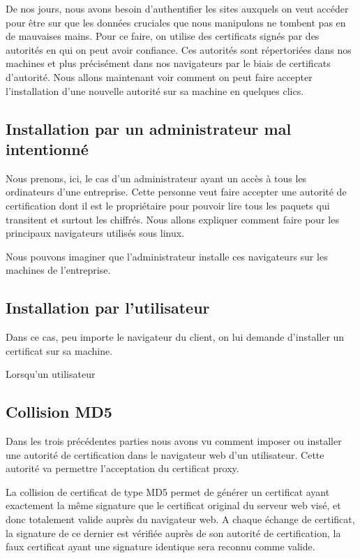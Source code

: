 De nos jours, nous avons besoin d'authentifier les sites auxquels on veut accéder pour être sur que les données cruciales que nous manipulons ne tombent pas en de mauvaises mains. Pour ce faire, on utilise des certificats signés par des autorités en qui on peut avoir confiance.
Ces autorités sont répertoriées dans nos machines et plus précisément dans nos navigateurs par le biais de certificats d'autorité.
Nous allons maintenant voir comment on peut faire accepter l'installation d'une nouvelle autorité sur sa machine en quelques clics.




\subsection{Installation par un administrateur mal intentionné}
Nous prenons, ici, le cas d'un administrateur ayant un accès à tous les ordinateurs d'une entreprise.
Cette personne veut faire accepter une autorité de certification dont il est le propriétaire pour pouvoir lire tous les paquets qui transitent et surtout les chiffrés.
Nous allons expliquer comment faire pour les principaux navigateurs utilisés sous linux.

Nous pouvons imaginer que l'administrateur installe ces navigateurs sur les machines de l'entreprise.
\newpage



\subsection{Installation par l'utilisateur}
Dans ce cas, peu importe le navigateur du client, on lui demande d'installer un certificat sur sa machine.

Lorsqu'un utilisateur


\subsection{Collision MD5}
Dans les trois précédentes parties nous avons vu comment imposer ou installer une 
autorité de certification dans le navigateur web d'un utilisateur. Cette 
autorité va permettre l'acceptation du certificat proxy.

La collision de certificat de type MD5 permet de générer un certificat ayant 
exactement la même signature que le certificat original du serveur web visé, et 
donc totalement valide auprès du navigateur web. A chaque échange de certificat, 
la signature de ce dernier est vérifiée auprès de son autorité de certification, 
la faux certificat ayant une signature identique sera reconnu comme valide.
~~\\

